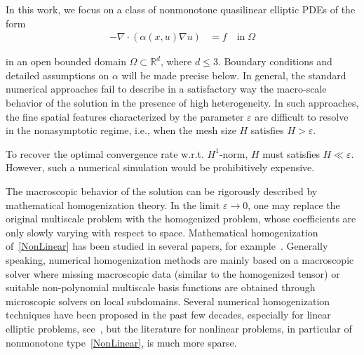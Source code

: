 \documentclass{article}
\begin{document}
In this work, we focus on a class of nonmonotone quasilinear elliptic PDEs of the form
\begin{equation}\label{NonLinear}
       \begin{split}
           -\nabla\cdot{(\alpha(x,u)\nabla{u})}&=f \quad\text{in} \;\Omega 
        \end{split}
\end{equation}

in an open bounded domain $\Omega \subset \mathbb{R}^d$, where $d\leq 3$. Boundary conditions and detailed assumptions on $\alpha$ will be made precise below.  
In general, the standard numerical approaches fail to describe in a satisfactory way the macro-scale behavior of the solution in the presence of high heterogeneity. In such approaches, the fine spatial features characterized by the parameter $\varepsilon$ are difficult to resolve in the nonasymptotic regime, i.e., when the mesh size $H$ satisfies $H> \varepsilon$. 
 
 To recover the optimal convergence rate w.r.t. $H^1$-norm, $H$ must satisfies $H\ll\varepsilon$. However, such a numerical simulation would be prohibitively expensive. 

 The macroscopic behavior of the solution can be rigorously described by mathematical homogenization theory. In the limit $\varepsilon \xrightarrow{}0$, one may replace the original multiscale problem with the homogenized problem, whose coefficients are only slowly varying with respect to space. Mathematical homogenization of~\eqref{NonLinear} has been studied in several papers, for example~\cite{MathematicalHomogenizaiton}. 
Generally speaking, numerical homogenization methods are mainly based on a macroscopic solver where missing macroscopic data (similar to the homogenized tensor) or suitable non-polynomial multiscale basis functions are obtained through microscopic solvers on local subdomains. 
Several numerical homogenization techniques have been proposed in the past few decades, especially for linear elliptic problems, see~\cite{HMM,MsFEMLINEAR, LOD-Linear, GMSFEM}, but the literature for nonlinear problems, in particular of nonmonotone type~\eqref{NonLinear}, is much more sparse. 
\end{document}
